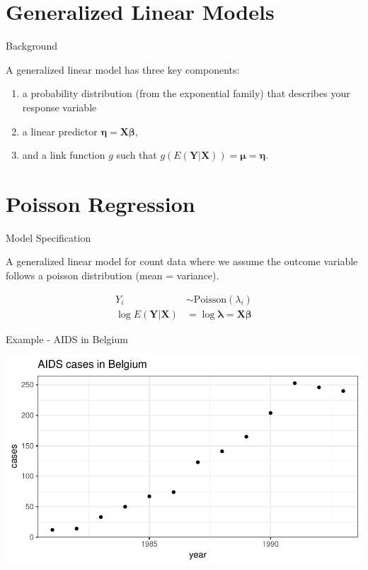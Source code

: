 \documentclass[11pt,ignorenonframetext,]{beamer}
\begin{document}
\section{Generalized Linear Models}\label{generalized-linear-models}

\begin{frame}{Background}

A generalized linear model has three key components:

\begin{enumerate}
\def\labelenumi{\arabic{enumi}.}
\item
  a probability distribution (from the exponential family) that
  describes your response variable
\item
  a linear predictor \(\bm{\eta} = \bm{X}\bm{\beta}\),
\item
  and a link function \(g\) such that
  \(g(E(\bm{Y}|\bm{X})) = \bm{\mu} = \bm{\eta}\).
\end{enumerate}

\end{frame}

\section{Poisson Regression}\label{poisson-regression}

\begin{frame}{Model Specification}

A generalized linear model for count data where we assume the outcome
variable follows a poisson distribution (mean = variance).

\[
\begin{aligned}
Y_i &\sim \text{Poisson}(\lambda_i)\\
 \log E(\bm{Y}|\bm{X}) &= \log{\bm{\lambda}} = \bm{X}\bm{\beta}
\end{aligned}
\]

\end{frame}

\begin{frame}{Example - AIDS in Belgium}

\includegraphics{Lec3_files/figure-beamer/unnamed-chunk-7-1.pdf}

\end{frame}
\end{document}
